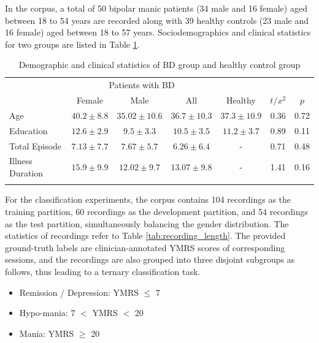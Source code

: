 In the corpus, a total of 50 bipolar manic patients (34 male and 16 female) aged between 18 to 54 years are recorded along with 39 healthy controls (23 male and 16 female) aged between 18 to 57 years. Sociodemographics and clinical statistics for two groups are listed in Table \ref{tab:demographic}. 

\begin{table}[ht]
    \small
    \centering
    \caption{Demographic and clinical statistics of BD group and healthy control group}
    \small
    \begin{tabular}{p{1.8cm}|c|c|c|c|c|c}
         \Xhline{2\arrayrulewidth}
         & \multicolumn{3}{c|}{Patients with BD} & & & \\
         & Female & Male & All & Healthy & $t/x^2$ & $p$  \\
         \hline
         Age & $40.2\pm8.8$ & $35.02\pm10.6$ & $36.7\pm10.3$ & $37.3\pm10.9$ & 0.36 & 0.72 \\
         \hline
         Education & $12.6\pm2.9$ & $9.5\pm3.3$ & $10.5\pm3.5$ & $11.2\pm3.7$ & 0.89 & 0.11 \\
         \hline
         Total Episode & $7.13\pm7.7$ & $7.67\pm5.7$ & $6.26\pm6.4$ & - & 0.71 & 0.48 \\
         \hline
         Illness Duration & $15.9\pm9.9$ & $12.02\pm9.7$ & $13.07\pm9.8$ & - & 1.41 & 0.16 \\
         \Xhline{2\arrayrulewidth}
    \end{tabular}
    \label{tab:demographic}
\end{table}


For the classification experiments, the corpus contains 104 recordings as the training partition, 60 recordings as the development partition, and 54 recordings as the test partition, simultaneously balancing the gender distribution. The statistics of recordings refer to Table \ref{tab:recording_length}. The provided ground-truth labels are clinician-annotated YMRS scores of corresponding sessions, and the recordings are also grouped into three disjoint subgroups as follows, thus leading to a ternary classification task.

\begin{itemize}
    \item Remission / Depression: YMRS $\leq$ 7
    \item Hypo-mania: 7 $<$ YMRS $<$ 20
    \item Mania: YMRS $\geq$ 20
\end{itemize}


